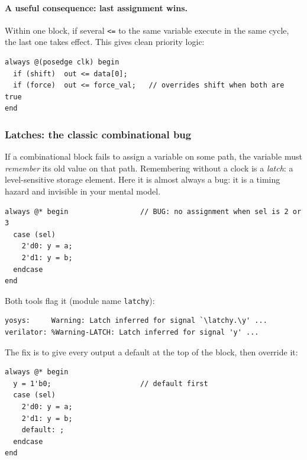\paragraph{A useful consequence: last assignment wins.} Within one block, if
several \texttt{<=} to the same variable execute in the same cycle, the last
one takes effect. This gives clean priority logic:
\begin{verbatim}
always @(posedge clk) begin
  if (shift)  out <= data[0];
  if (force)  out <= force_val;   // overrides shift when both are true
end
\end{verbatim}

\subsubsection{Latches: the classic combinational bug}

If a combinational block fails to assign a variable on some path, the
variable must \emph{remember} its old value on that path. Remembering without
a clock is a \emph{latch}: a level-sensitive storage element. Here it is
almost always a bug: it is a timing hazard and invisible in your mental
model.
\begin{verbatim}
always @* begin                 // BUG: no assignment when sel is 2 or 3
  case (sel)
    2'd0: y = a;
    2'd1: y = b;
  endcase
end
\end{verbatim}
Both tools flag it (module name \texttt{latchy}):
\begin{verbatim}
yosys:     Warning: Latch inferred for signal `\latchy.\y' ...
verilator: %Warning-LATCH: Latch inferred for signal 'y' ...
\end{verbatim}
The fix is to give every output a default at the top of the block, then
override it:
\begin{verbatim}
always @* begin
  y = 1'b0;                     // default first
  case (sel)
    2'd0: y = a;
    2'd1: y = b;
    default: ;
  endcase
end
\end{verbatim}

